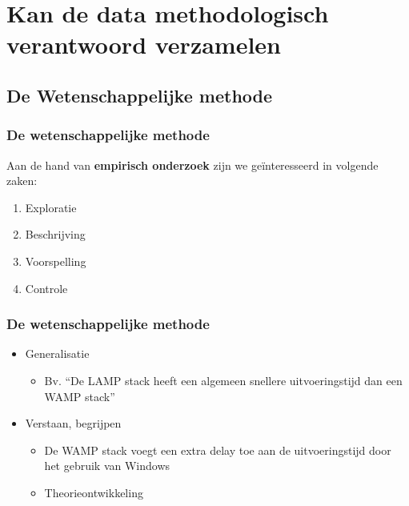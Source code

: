 \section{Kan de data methodologisch verantwoord verzamelen}
\sectionframelogo{}
\subsection{De Wetenschappelijke methode}

\begin{frame}
\end{frame}


\begin{frame}
  \frametitle{De wetenschappelijke methode}

  Aan de hand van \textbf{empirisch onderzoek} zijn we geïnteresseerd in volgende zaken:

  \begin{enumerate}
    \item Exploratie
    \item Beschrijving
    \item Voorspelling
    \item Controle
  \end{enumerate}
\end{frame}

\begin{frame}
  \frametitle{De wetenschappelijke methode}
    \begin{itemize}
      \item Generalisatie
        \begin{itemize}
          \item Bv. ``De LAMP stack heeft een algemeen snellere uitvoeringstijd dan een WAMP stack''
        \end{itemize}
      \item Verstaan, begrijpen
        \begin{itemize}
          \item De WAMP stack voegt een extra delay toe aan de uitvoeringstijd door het gebruik van Windows 
          \item Theorieontwikkeling
        \end{itemize}
    \end{itemize}
\end{frame}

